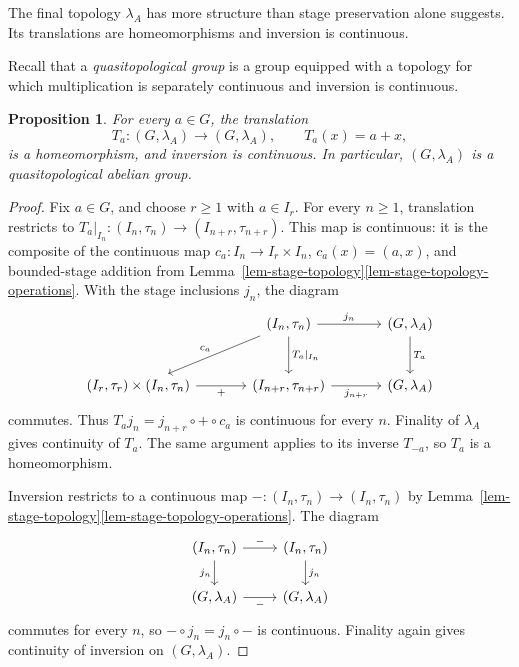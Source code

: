 \documentclass[preprint,3p]{elsarticle}
\theoremstyle{plain}
\newtheorem{prop}[thm]{Proposition}
\theoremstyle{definition}
\numberwithin{equation}{section}
\begin{document}
The final topology $\lambda_A$ has more structure than
stage preservation alone suggests.  Its translations are
homeomorphisms and inversion is continuous.

Recall that a \emph{quasitopological group} \cite{Arhangelskii2008} 
is a group equipped with a
topology for which multiplication is separately continuous and inversion
is continuous.

\begin{prop}
\label{prop-lambda-quasitopological}
For every $a\in G$, the translation
\[
 T_a\colon(G,\lambda_A)\longrightarrow(G,\lambda_A),
 \qquad T_a(x)=a+x,
\]
is a homeomorphism, and inversion is continuous.  In particular,
$(G,\lambda_A)$ is a quasitopological abelian group.
\end{prop}

\begin{proof}
Fix $a\in G$, and choose $r\geq1$ with $a\in I_r$.
For every $n\geq1$, translation restricts to
$T_a|_{I_n}\colon(I_n,\tau_n)\longrightarrow(I_{n+r},\tau_{n+r})$.
This map is continuous: it is the composite of the continuous map
$c_a\colon I_n\longrightarrow I_r\times I_n$, $c_a(x)=(a,x)$,
and bounded-stage addition from
Lemma~\ref{lem-stage-topology}\ref{lem-stage-topology-operations}.
With the stage inclusions $j_n$, the diagram
\[
\begin{tikzcd}[column sep=large,row sep=large]
&
(I_n,\tau_n)
  \arrow[dl,"c_a"']
  \arrow[d,"T_a|_{I_n}"]
  \arrow[r,"j_n"]
&
(G,\lambda_A)
  \arrow[d,"T_a"]
\\
(I_r,\tau_r)\times(I_n,\tau_n)
  \arrow[r,"+"']
&
(I_{n+r},\tau_{n+r})
  \arrow[r,"j_{n+r}"']
&
(G,\lambda_A)
\end{tikzcd}
\]
commutes.  Thus $T_aj_n=j_{n+r}\circ+\circ c_a$ is continuous
for every $n$.  Finality of $\lambda_A$ gives continuity of $T_a$.
The same argument applies to its inverse $T_{-a}$, so $T_a$ is a
homeomorphism.

Inversion restricts to a continuous map
$-\colon(I_n,\tau_n)\longrightarrow(I_n,\tau_n)$ by
Lemma~\ref{lem-stage-topology}\ref{lem-stage-topology-operations}.
The diagram
\[
\begin{tikzcd}
(I_n,\tau_n)
  \arrow[r,"-"]
  \arrow[d,"j_n"']
&
(I_n,\tau_n)
  \arrow[d,"j_n"]
\\
(G,\lambda_A)
  \arrow[r,"-"']
&
(G,\lambda_A)
\end{tikzcd}
\]
commutes for every $n$, so $-\circ j_n=j_n\circ-$ is continuous.
Finality again gives continuity of inversion on $(G,\lambda_A)$.
\end{proof}
\end{document}
